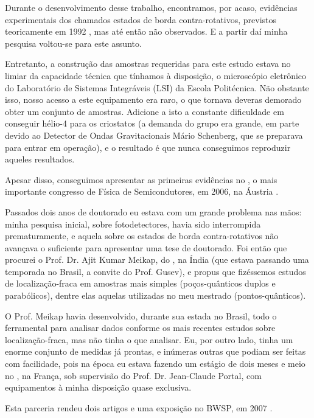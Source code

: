 Durante o desenvolvimento desse trabalho, encontramos, por acaso, evidências experimentais dos chamados estados de borda contra-rotativos, previstos teoricamente em 1992 \cite{johnson-1992}, mas até então não observados. E a partir daí minha pesquisa voltou-se para este assunto.

Entretanto, a construção das amostras requeridas para este estudo estava no limiar da capacidade técnica que tínhamos à disposição, o microscópio eletrônico do Laboratório de Sistemas Integráveis (LSI) da Escola Politécnica. Não obstante isso, nosso acesso a este equipamento era raro, o que tornava deveras demorado obter um conjunto de amostras. Adicione a isto a constante dificuldade em conseguir hélio-4 para os criostatos (a demanda do grupo era grande, em parte devido ao Detector de Ondas Gravitacionais Mário Schenberg, que se preparava para entrar em operação), e o resultado é que nunca conseguimos reproduzir aqueles resultados.

Apesar disso, conseguimos apresentar as primeiras evidências no , o mais importante congresso de Física de Semicondutores, em 2006, na Áustria \cite{pagnossin-2006}.

Passados dois anos de doutorado eu estava com um grande problema nas mãos: minha pesquisa inicial, sobre fotodetectores, havia sido interrompida prematuramente, e aquela sobre os estados de borda contra-rotativos não avançava o suficiente para apresentar uma tese de doutorado. Foi então que procurei o Prof. Dr. Ajit Kumar Meikap, do , na Índia (que estava passando uma temporada no Brasil, a convite do Prof. Gusev), e propus que fizéssemos estudos de localização-fraca em amostras mais simples (poços-quânticos duplos e parabólicos), dentre elas aquelas utilizadas no meu mestrado (pontos-quânticos).

O Prof. Meikap havia desenvolvido, durante sua estada no Brasil, todo o ferramental para analisar dados conforme os mais recentes estudos sobre localização-fraca, mas não tinha o que analisar. Eu, por outro lado, tinha um enorme conjunto de medidas já prontas, e inúmeras outras que podiam ser feitas com facilidade, pois na época eu estava fazendo um estágio de dois meses e meio no , na França, sob supervisão do Prof. Dr. Jean-Claude Portal, com equipamentos à minha disposição quase exclusiva.

Esta parceria rendeu dois artigos \cite{pagnossin-2008-1, pagnossin-2008-2} e uma exposição no  BWSP, em 2007 \cite{pagnossin-2007}.

